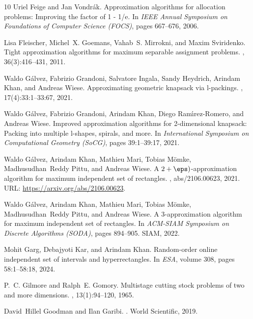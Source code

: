 \begin{thebibliography}{10}
Uriel Feige and Jan Vondr{\'{a}}k.
\newblock Approximation algorithms for allocation problems: Improving the
  factor of 1 - 1/e.
\newblock In {\em IEEE Annual Symposium on Foundations of Computer Science
  (FOCS)}, pages 667--676, 2006.

Lisa Fleischer, Michel~X. Goemans, Vahab~S. Mirrokni, and Maxim Sviridenko.
\newblock Tight approximation algorithms for maximum separable assignment
  problems.
, 36(3):416--431, 2011.

Waldo G{\'{a}}lvez, Fabrizio Grandoni, Salvatore Ingala, Sandy Heydrich,
  Arindam Khan, and Andreas Wiese.
\newblock Approximating geometric knapsack via l-packings.
, 17(4):33:1--33:67, 2021.

Waldo G{\'{a}}lvez, Fabrizio Grandoni, Arindam Khan, Diego
  Ram{\'{\i}}rez{-}Romero, and Andreas Wiese.
\newblock Improved approximation algorithms for 2-dimensional knapsack: Packing
  into multiple l-shapes, spirals, and more.
\newblock In {\em International Symposium on Computational Geometry (SoCG)},
  pages 39:1--39:17, 2021.

Waldo G{\'{a}}lvez, Arindam Khan, Mathieu Mari, Tobias M{\"{o}}mke,
  Madhusudhan~Reddy Pittu, and Andreas Wiese.
\newblock A $2+\eps)$-approximation algorithm for maximum independent set of
  rectangles.
, abs/2106.00623, 2021.
\newblock URL: \url{https://arxiv.org/abs/2106.00623}.

Waldo G{\'{a}}lvez, Arindam Khan, Mathieu Mari, Tobias M{\"{o}}mke,
  Madhusudhan~Reddy Pittu, and Andreas Wiese.
\newblock A 3-approximation algorithm for maximum independent set of
  rectangles.
\newblock In {\em ACM-SIAM Symposium on Discrete Algorithms (SODA)}, pages
  894--905. {SIAM}, 2022.

Mohit Garg, Debajyoti Kar, and Arindam Khan.
\newblock Random-order online independent set of intervals and hyperrectangles.
\newblock In {\em ESA}, volume 308, pages 58:1--58:18, 2024.

P.~C. Gilmore and Ralph~E. Gomory.
\newblock Multistage cutting stock problems of two and more dimensions.
, 13(1):94--120, 1965.

David~Hillel Goodman and Ilan Garibi.
.
\newblock World Scientific, 2019.


\end{thebibliography}
